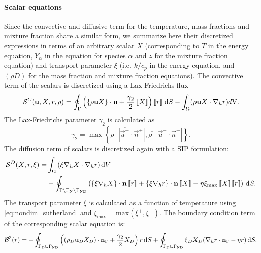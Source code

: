 \paragraph{Scalar equations}
Since the convective and diffusive term for the temperature, mass fractions and mixture fraction share a similar form, we summarize here their discretized expressions in terms of an arbitrary scalar $X$ (corresponding to $T$ in the energy equation, $Y_\alpha$ in the equation for species $\alpha$ and $z$ for the mixture fraction equation) and transport parameter $\xi$ (i.e. $k/c_p$ in the energy equation, and $(\rho D)$ for the mass fraction and mixture fraction equations). The convective term of the scalars is discretized using a Lax-Friedrichs flux
\begin{equation}
	\mathcal{S}^C(\textbf{u},X,r, \rho) =  \oint_{\Gamma}{\left( \left\{{\rho\textbf{u}X }\right\}\cdot \textbf{n} + \frac{\gamma_2}{2}\left[\!\left[{{X}}\right]\!\right]\right)\left[\!\left[{{r}}\right]\!\right] \,\mathrm{d} S}
	- \int_{\Omega}({\rho \textbf{u} X \cdot \nabla_h r) d\text{V}}. \label{eq:scalar_convective}
\end{equation}
The Lax-Friedrichs parameter $\gamma_2$ is calculated as \cite{kleinHighorderDiscontinuousGalerkin2016}
\begin{equation}
	\gamma_2  = \max \left\{\overline{\rho^+} |\overline{\vec{u}^+} \cdot \vec{n}^+|,\overline{\rho^-} |\overline{\vec{u}^-} \cdot \vec{n}^-|\right\}.
	\label{eq:vardens_lambda2}
\end{equation}
The diffusion term of scalars is discretized again with a SIP formulation:
\begin{align}
	\mathcal{S}^D(X,r,\xi)= & \int_{\Omega}{ \left(\xi \nabla_h X \cdot\nabla_h r\right) }\dV \notag         \\
	                        & -\oint_{\Gamma \setminus \Gamma_{\text{N}}\setminus \Gamma_{\text{ND}}}{\left(
		\mean{\xi \nabla_h X}\cdot \vec{n}\jump{r} +
		\mean{\xi \nabla_h r}\cdot \vec{n}\jump{X} -
		\eta \xi_{\text{max}} \jump{X} \jump{r}
		\right) \dS.
	} \label{eq:Temp_diffusive}
\end{align}
The transport parameter $\xi$ is calculated as a function of temperature using \cref{eq:nondim_sutherland} and $\xi_{\text{max}} = \text{max}(\xi^{+}, \xi^{-})$.
The boundary condition term of the corresponding scalar equation is:
\begin{equation}
	\mathcal{B}^3(r) =  -
	\oint_{\Gamma_{\text{D}}\cup \Gamma_{\text{ND}}}{ \left( (\rho_D\textbf{u}_D X_D)\cdot \textbf{n}_{\Gamma} + \frac{\gamma_2}{2}X_D\right)r \,\mathrm{d} S}
	+\oint_{\Gamma_{\text{D}}\cup \Gamma_{\text{ND}}} \xi_D X_D(\nabla_h r \cdot \textbf{n}_{\Gamma} - \eta r )\,\mathrm{d} S.
\end{equation}
